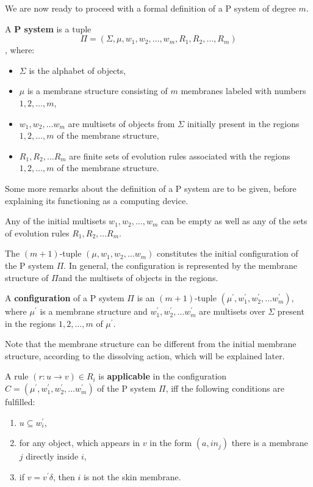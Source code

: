 We are now ready to proceed with a formal definition of a P system of degree $m$.

\begin{definition}
  A {\bf P system} is a tuple $$\Pi = (\Sigma, \mu, w_1, w_2,\ldots , w_m, R_1, R_2,\ldots , R_m)$$, where:
  \begin{itemize}
    \item $\Sigma$ is the alphabet of objects,
    \item $\mu$ is a membrane structure consisting of $m$ membranes labeled with numbers $1,2,\dots,m$,
    \item $w_1,w_2,\ldots w_m$ are multisets of objects from $\Sigma$ initially present in the regions $1,2,\ldots,m$ of the membrane structure,
    \item $R_1,R_2,\ldots R_m$ are finite sets of evolution rules associated with the regions $1,2,\dots,m$ of the membrane structure.
  \end{itemize}
\end{definition}

Some more remarks about the definition of a P system are to be given, before explaining its functioning as a computing device.

Any of the initial multisets $w_1, w_2,\dots , w_m$ can be empty as well as any of the sets of evolution rules $R_1,R_2,\ldots R_m$.

The $(m+1)$-tuple $(\mu, w_1,w_2,\ldots w_m)$ constitutes the initial configuration of the P system $\Pi$. In general, the configuration is represented by the membrane structure of $\Pi$and the multisets of objects in the regions.

\begin{definition}
  A {\bf configuration} of a P system $\Pi$ is an $(m+1)$-tuple $(\mu^\prime, w^\prime_1,w^\prime_2,\ldots w^\prime_m)$, where $\mu^\prime$ is a membrane structure and $w^\prime_1,w^\prime_2,\ldots w^\prime_m$ are multisets over $\Sigma$ present in the regions $1,2,\ldots,m$ of $\mu^\prime$.
\end{definition}

Note that the membrane structure can be different from the initial membrane structure, according to the dissolving action, which will be explained later.

\begin{definition}
  A rule $(r: u\rightarrow v)\in R_i$ is {\bf applicable} in the configuration $C = (\mu^\prime, w^\prime_1,w^\prime_2,\ldots w^\prime_m)$ of the P system $\Pi$, iff the following conditions are fulfilled:
  \begin{enumerate}
    \item $u\subseteq w^\prime_i$,
    \item for any object, which appears in $v$ in the form $(a, in_j)$ there is a membrane $j$ directly inside $i$,
    \item if $v=v^\prime\delta$, then $i$ is not the skin membrane.
  \end{enumerate}
\end{definition}

